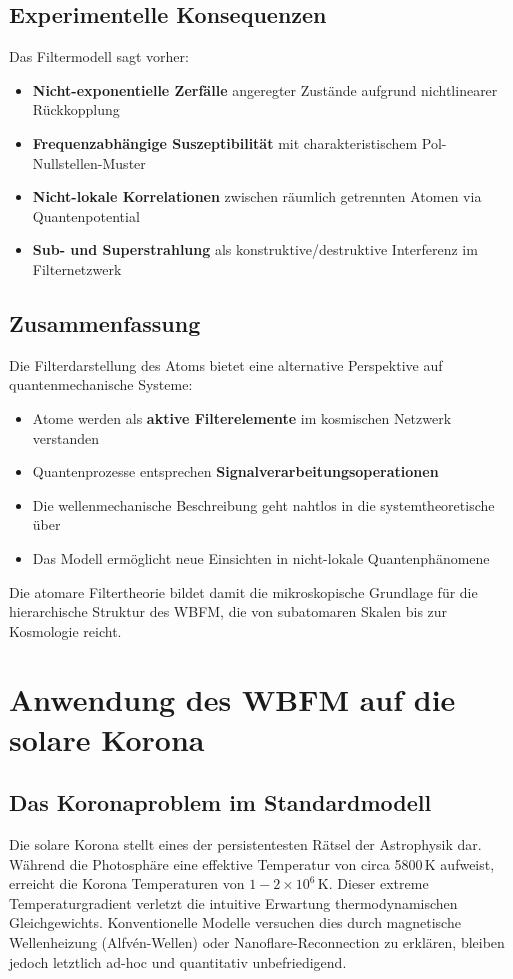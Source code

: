 \section{Experimentelle Konsequenzen}

Das Filtermodell sagt vorher:
\begin{itemize}
\item \textbf{Nicht-exponentielle Zerfälle} angeregter Zustände aufgrund nichtlinearer Rückkopplung
\item \textbf{Frequenzabhängige Suszeptibilität} mit charakteristischem Pol-Nullstellen-Muster
\item \textbf{Nicht-lokale Korrelationen} zwischen räumlich getrennten Atomen via Quantenpotential
\item \textbf{Sub- und Superstrahlung} als konstruktive/destruktive Interferenz im Filternetzwerk
\end{itemize}

\section{Zusammenfassung}

Die Filterdarstellung des Atoms bietet eine alternative Perspektive auf quantenmechanische Systeme:
\begin{itemize}
\item Atome werden als \textbf{aktive Filterelemente} im kosmischen Netzwerk verstanden
\item Quantenprozesse entsprechen \textbf{Signalverarbeitungsoperationen}
\item Die wellenmechanische Beschreibung geht nahtlos in die systemtheoretische über
\item Das Modell ermöglicht neue Einsichten in nicht-lokale Quantenphänomene
\end{itemize}

Die atomare Filtertheorie bildet damit die mikroskopische Grundlage für die hierarchische Struktur des WBFM, die von subatomaren Skalen bis zur Kosmologie reicht.

\chapter{Anwendung des WBFM auf die solare Korona}

\section{Das Koronaproblem im Standardmodell}
Die solare Korona stellt eines der persistentesten Rätsel der Astrophysik dar. Während die Photosphäre eine effektive Temperatur von circa 5800\,K aufweist, erreicht die
Korona Temperaturen von $1-2\times 10^6$\,K. Dieser extreme Temperaturgradient verletzt die intuitive Erwartung thermodynamischen Gleichgewichts. Konventionelle Modelle
versuchen dies durch magnetische Wellenheizung (Alfvén-Wellen) oder Nanoflare-Reconnection zu erklären, bleiben jedoch letztlich ad-hoc und quantitativ unbefriedigend.


